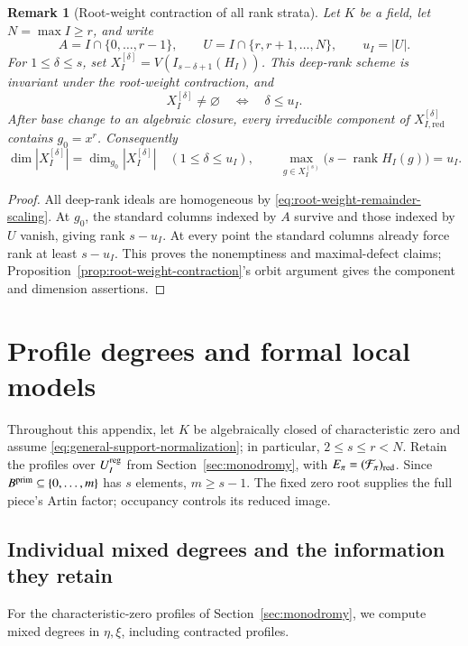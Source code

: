 \documentclass[10pt,fleqn]{article}
\numberwithin{equation}{section}
\newtheorem{remark}[theorem]{Remark}
\newcommand{\cF}{\mathcal F}
\newcommand{\rank}{\operatorname{rank}}
\begin{document}
\begin{remark}[Root-weight contraction of all rank strata]
\label{cor:vertex-maximal-defect}
Let $K$ be a field, let $N=\max I\ge r$, and write
\[
 A=I\cap\{0,\ldots,r-1\},\qquad
 U=I\cap\{r,r+1,\ldots,N\},\qquad
 u_I=|U|.
\]
For $1\le\delta\le s$, set $X_I^{[\delta]}=V(I_{s-\delta+1}(H_I))$.
This deep-rank scheme is invariant under the root-weight contraction, and
\[
 X_I^{[\delta]}\ne\varnothing
 \quad\Longleftrightarrow\quad
 \delta\le u_I.
\]
After base change to an algebraic closure, every irreducible component of
$X_{I,\mathrm{red}}^{[\delta]}$ contains $g_0=x^r$.  Consequently
\[
 \dim |X_I^{[\delta]}|=\dim_{g_0}|X_I^{[\delta]}|\quad(1\le\delta\le u_I),
 \qquad
 \max_{g\in X_I^{(s)}}\bigl(s-\rank H_I(g)\bigr)=u_I.
\]
\end{remark}

\begin{proof}
All deep-rank ideals are homogeneous by
\eqref{eq:root-weight-remainder-scaling}.  At $g_0$, the standard
columns indexed by $A$ survive and those indexed by $U$ vanish, giving
rank $s-u_I$.  At every point the standard columns already force rank
at least $s-u_I$.  This proves the nonemptiness and maximal-defect
claims; Proposition~\ref{prop:root-weight-contraction}'s orbit argument
gives the component and dimension assertions.
\end{proof}


\section{Profile degrees and formal local models}\label{sec:formal}

Throughout this appendix, let $K$ be algebraically closed of
characteristic zero and assume
\eqref{eq:general-support-normalization}; in particular,
$2\le s\le r<N$.  Retain the profiles over $U_I^{\rm reg}$ from
Section~\ref{sec:monodromy}, with $E_\pi=(\cF_\pi)_{\rm red}$.
Since $B^{\rm prim}\subseteq\{0,\ldots,m\}$ has $s$ elements,
$m\ge s-1$.
The fixed zero root supplies the full piece's Artin factor;
occupancy controls its reduced image.

\subsection{Individual mixed degrees and the information they retain}
\label{v6:degree:section}

For the characteristic-zero profiles of Section~\ref{sec:monodromy},
we compute mixed degrees in $\eta,\xi$, including contracted profiles.
\end{document}

